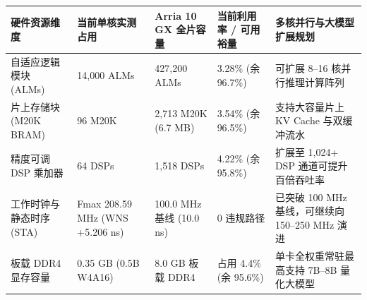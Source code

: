\documentclass[11pt,a4paper]{article}
\begin{document}
{\footnotesize\renewcommand{\arraystretch}{1.14}\begin{longtable}{@{}L{0.19\textwidth}L{0.16\textwidth}L{0.16\textwidth}L{0.15\textwidth}L{0.24\textwidth}@{}}\toprule

\textbf{硬件资源维度} & \textbf{当前单核实测占用} & \textbf{Arria 10 GX 全片容量} & \textbf{当前利用率 /\allowbreak{} 可用裕量} & \textbf{多核并行与大模型扩展规划}\\\midrule\endhead

自适应逻辑模块 (\allowbreak{}ALMs)\allowbreak{} & 14,\allowbreak{}000 ALMs & 427,\allowbreak{}200 ALMs & 3.28\% (\allowbreak{}余 96.7\%)\allowbreak{} & 可扩展 8–16 核并行推理计算阵列\\[2pt]

片上存储块 (\allowbreak{}M20K BRAM)\allowbreak{} & 96 M20K & 2,\allowbreak{}713 M20K (\allowbreak{}6.7 MB)\allowbreak{} & 3.54\% (\allowbreak{}余 96.5\%)\allowbreak{} & 支持大容量片上 KV Cache 与双缓冲流水\\[2pt]

精度可调 DSP 乘加器 & 64 DSPs & 1,\allowbreak{}518 DSPs & 4.22\% (\allowbreak{}余 95.8\%)\allowbreak{} & 扩展至 1,\allowbreak{}024+\allowbreak{} DSP 通道可提升百倍吞吐率\\[2pt]

工作时钟与静态时序 (\allowbreak{}STA)\allowbreak{} & Fmax 208.59 MHz (\allowbreak{}WNS +\allowbreak{}5.206 ns)\allowbreak{} & 100.0 MHz 基线 (\allowbreak{}10.0 ns)\allowbreak{} & 0 违规路径 & 已突破 100 MHz 基线，可继续向 150–250 MHz 演进\\[2pt]

板载 DDR4 显存容量 & 0.35 GB (\allowbreak{}0.5B W4A16)\allowbreak{} & 8.0 GB 板载 DDR4 & 占用 4.4\% (\allowbreak{}余 95.6\%)\allowbreak{} & 单卡全权重常驻最高支持 7B–8B 量化大模型\\[2pt]

\bottomrule\end{longtable}}
\end{document}
